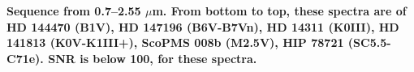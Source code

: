 {\bf Sequence from 0.7–2.55 $\mu$m. From bottom to top, these spectra are of HD 144470 (B1V), HD 147196 (B6V-B7Vn), HD 14311 (K0III), HD 141813 (K0V-K1III+), ScoPMS 008b (M2.5V), HIP 78721 (SC5.5-C71e).  SNR is below 100, for these spectra. \label{fig:low-snr}}
